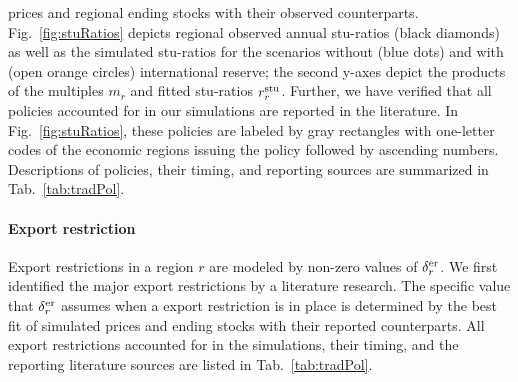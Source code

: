 prices and regional ending stocks with their observed counterparts. Fig.~\ref{fig:stuRatios} depicts
regional observed annual stu-ratios (black diamonds) as well as the simulated stu-ratios for the
scenarios without (blue dots) and with (open orange circles) international reserve; the second
y-axes depict the products of the multiples $m_r$ and fitted stu-ratios $r^{\operatorname{stu}}_r$. Further, we
have verified that all policies accounted for in our simulations are reported in the literature. In
Fig.~\ref{fig:stuRatios}, these policies are labeled by gray rectangles with one-letter codes of the
economic regions issuing the policy followed by ascending numbers. Descriptions of policies, their
timing, and reporting sources are summarized in Tab.~\ref{tab:tradPol}.

\paragraph*{Export restriction}
Export restrictions in a region $r$ are modeled by non-zero values of $\delta^{\operatorname{er}}_r$. We first identified
the major export restrictions by a literature research. The specific value that $\delta^{\operatorname{er}}_r$ assumes
when a export restriction is in place is determined by the best fit of simulated prices and ending
stocks with their reported counterparts. All export restrictions accounted for in the simulations,
their timing, and the reporting literature sources are listed in Tab.~\ref{tab:tradPol}.
